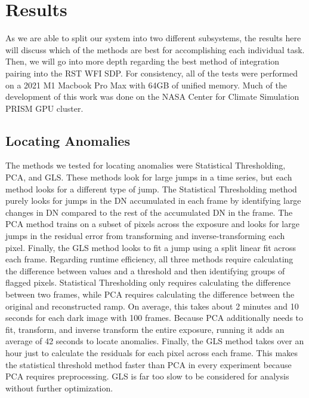 \section{Results}
\label{rst/sec:results}

As we are able to split our system into two different subsystems, the results here will discuss which of the methods are best for accomplishing each individual task. 
Then, we will go into more depth regarding the best method of integration pairing into the RST WFI SDP. 
For consistency, all of the tests were performed on a 2021 M1 Macbook Pro Max with 64GB of unified memory.
Much of the development of this work was done on the NASA Center for Climate Simulation PRISM GPU cluster. 

\subsection{Locating Anomalies}
The methods we tested for locating anomalies were Statistical Thresholding, PCA, and GLS.
These methods look for large jumps in a time series, but each method looks for a different type of jump.
The Statistical Thresholding method purely looks for jumps in the DN accumulated in each frame by identifying large changes in DN compared to the rest of the accumulated DN in the frame. 
The PCA method trains on a subset of pixels across the exposure and looks for large jumps in the residual error from transforming and inverse-transforming each pixel. 
Finally, the GLS method looks to fit a jump using a split linear fit across each frame.
Regarding runtime efficiency, all three methods require calculating the difference between values and a threshold and then identifying groups of flagged pixels. 
Statistical Thresholding only requires calculating the difference between two frames, while PCA requires calculating the difference between the original and reconstructed ramp.
On average, this takes about 2 minutes and 10 seconds for each dark image with 100 frames. 
Because PCA additionally needs to fit, transform, and inverse transform the entire exposure, running it adds an average of 42 seconds to locate anomalies. 
Finally, the GLS method takes over an hour just to calculate the residuals for each pixel across each frame.
This makes the statistical threshold method faster than PCA in every experiment because PCA requires preprocessing. 
GLS is far too slow to be considered for analysis without further optimization.

